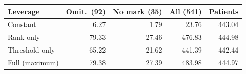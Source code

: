 \begin{tabular}{lrrrr}
\toprule
Leverage & Omit.\ (92) & No mark (35) & All (541) & Patients \\
\midrule
Constant & 6.27 & 1.79 & 23.76 & 443.04 \\
Rank only & 79.33 & 27.46 & 476.83 & 444.98 \\
Threshold only & 65.22 & 21.62 & 441.39 & 442.44 \\
Full (maximum) & 79.38 & 27.39 & 483.98 & 444.97 \\
\bottomrule
\end{tabular}
